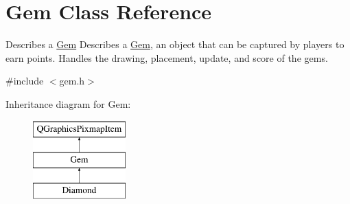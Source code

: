 \hypertarget{classGem}{\section{Gem Class Reference}
\label{classGem}
}


Describes a \hyperlink{classGem}{Gem} Describes a \hyperlink{classGem}{Gem}, an object that can be captured by players to earn points. Handles the drawing, placement, update, and score of the gems.  




{\ttfamily \#include $<$gem.\-h$>$}

Inheritance diagram for Gem\-:\begin{figure}[H]
\begin{center}
\leavevmode
\includegraphics[height=3.000000cm]{classGem}
\end{center}
\end{figure}
